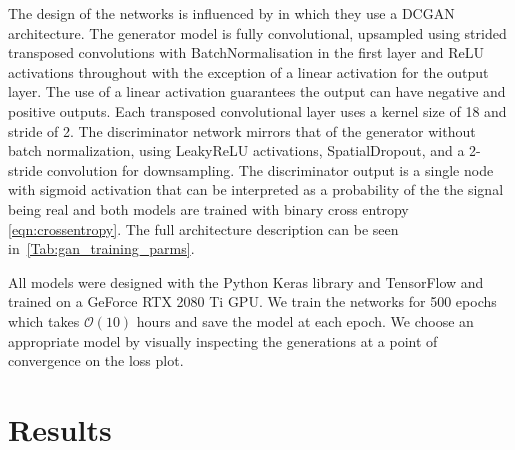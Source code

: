 \documentclass[12pt]{iopart}
\begin{document}
The design of the networks is influenced by \cite{Radford2015} in which they use a \ac{DCGAN} architecture. The generator model is fully convolutional, upsampled using strided transposed convolutions with BatchNormalisation in the first layer and ReLU activations throughout with the exception of a linear activation for the output layer. The use of a linear activation guarantees the output can have negative and positive outputs. Each transposed convolutional layer uses a kernel size of 18 and stride of 2. The discriminator network mirrors that of the generator without batch normalization, using LeakyReLU activations, SpatialDropout, and a 2-stride convolution for downsampling. The discriminator output is a single node with sigmoid activation that can be interpreted as a probability of the the signal being real and both models are trained with binary cross entropy \cref{eqn:crossentropy}. The full architecture description can be seen in~\cref{Tab:gan_training_parms}.

All models were designed with the Python Keras library \cite{chollet2015keras} and TensorFlow \cite{tensorflow2015-whitepaper} and trained on a GeForce RTX 2080 Ti GPU. We train the networks for 500 epochs which takes $\mathcal{O}(10)$ hours and save the model at each epoch. We choose an appropriate model by visually inspecting the generations at a point of convergence on the loss plot. 
\section{Results} \label{results}

\end{document}

